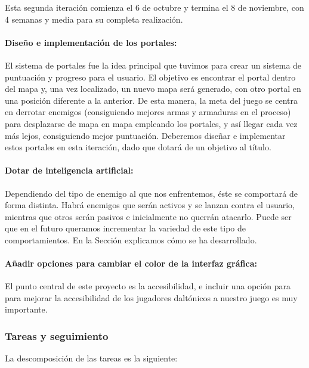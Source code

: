Esta segunda iteración comienza el 6 de octubre y termina el 8 de noviembre, con 4 semanas y media para su completa realización.

\paragraph{Diseño e implementación de los portales:} El sistema de portales fue la idea principal que tuvimos para crear un sistema de puntuación y progreso para el usuario. El objetivo es encontrar el portal dentro del mapa y, una vez localizado, un nuevo mapa será generado, con otro portal en una posición diferente a la anterior. De esta manera, la meta del juego se centra en derrotar enemigos (consiguiendo mejores armas y armaduras en el proceso) para desplazarse de mapa en mapa empleando los portales, y así llegar cada vez más lejos, consiguiendo mejor puntuación.
Deberemos diseñar e implementar estos portales en esta iteración, dado que dotará de un objetivo al título.

\paragraph{Dotar de inteligencia artificial:} Dependiendo del tipo de enemigo al que nos enfrentemos, éste se comportará de forma distinta. Habrá enemigos que serán activos y se lanzan contra el usuario, mientras que otros serán pasivos e inicialmente no querrán atacarlo. Puede ser que en el futuro queramos incrementar la variedad de este tipo de comportamientos. En la Sección \cite{sec:ia} explicamos cómo se ha desarrollado.

\paragraph{Añadir opciones para cambiar el color de la interfaz gráfica:} El punto central de este proyecto es la accesibilidad, e incluir una opción para para mejorar la accesibilidad de los jugadores daltónicos a nuestro juego es muy importante.

\subsubsection{Tareas y seguimiento}

La descomposición de las tareas es la siguiente:

